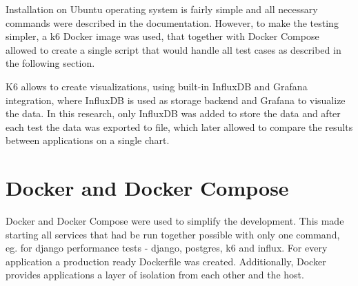 Installation on Ubuntu operating system is fairly simple and all necessary commands were described in the documentation. However, to make the testing simpler, a k6 Docker image was used, that together with Docker Compose allowed to create a single script that would handle all test cases as described in the following section.

K6 allows to create visualizations, using built-in InfluxDB and Grafana integration, where InfluxDB is used as storage backend and Grafana to visualize the data. In this research, only InfluxDB was added to store the data and after each test the data was exported to file, which later allowed to compare the results between applications on a single chart.

\section{Docker and Docker Compose}

Docker and Docker Compose were used to simplify the development. This made starting all services that had be run together possible with only one command, eg. for django performance tests - django, postgres, k6 and influx. For every application a production ready Dockerfile was created. Additionally, Docker provides applications a layer of isolation from each other and the host.
